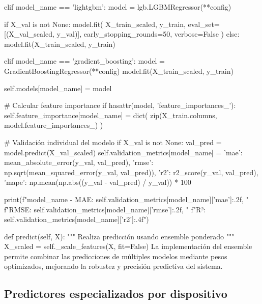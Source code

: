             elif model_name == 'lightgbm':
                model = lgb.LGBMRegressor(**config)
                
                if X_val is not None:
                    model.fit(
                        X_train_scaled, y_train,
                        eval_set=[(X_val_scaled, y_val)],
                        early_stopping_rounds=50,
                        verbose=False
                    )
                else:
                    model.fit(X_train_scaled, y_train)
                    
            elif model_name == 'gradient_boosting':
                model = GradientBoostingRegressor(**config)
                model.fit(X_train_scaled, y_train)
            
            self.models[model_name] = model
            
            # Calcular feature importance
            if hasattr(model, 'feature_importances_'):
                self.feature_importance[model_name] = dict(
                    zip(X_train.columns, model.feature_importances_)
                )
            
            # Validación individual del modelo
            if X_val is not None:
                val_pred = model.predict(X_val_scaled)
                self.validation_metrics[model_name] = {
                    'mae': mean_absolute_error(y_val, val_pred),
                    'rmse': np.sqrt(mean_squared_error(y_val, val_pred)),
                    'r2': r2_score(y_val, val_pred),
                    'mape': np.mean(np.abs((y_val - val_pred) / y_val)) * 100
                }
                
                print(f"{model_name} - MAE: {self.validation_metrics[model_name]['mae']:.2f}, "
                      f"RMSE: {self.validation_metrics[model_name]['rmse']:.2f}, "
                      f"R²: {self.validation_metrics[model_name]['r2']:.4f}")
    
    def predict(self, X):
        """
        Realiza predicción usando ensemble ponderado
        """
        X_scaled = self._scale_features(X, fit=False)
La implementación del ensemble permite combinar las predicciones de múltiples modelos mediante pesos optimizados, mejorando la robustez y precisión predictiva del sistema.

\subsection{Predictores especializados por dispositivo}

